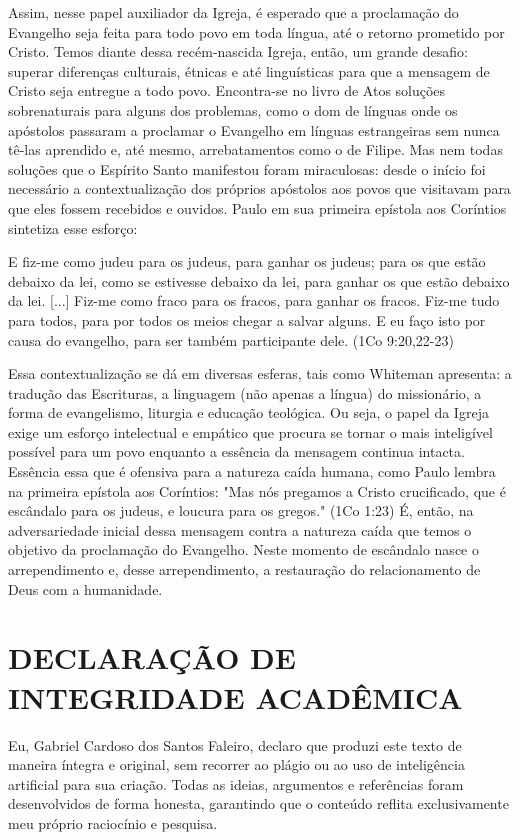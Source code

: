\documentclass[
    article,            %
	12pt,				%
	oneside,			%
	a4paper,			%
	chapter=TITLE,		%
	section=TITLE,		%
	english,			%
	french,				%
	spanish,			%
	brazil				%
	]{abntex2}
\begin{document}
Assim, nesse papel auxiliador da Igreja, é esperado que a proclamação do Evangelho seja feita para todo povo em toda língua, até o retorno prometido por Cristo. Temos diante dessa recém-nascida Igreja, então, um grande desafio: superar diferenças culturais, étnicas e até linguísticas para que a mensagem de Cristo seja entregue a todo povo. Encontra-se no livro de Atos soluções sobrenaturais para alguns dos problemas, como o dom de línguas onde os apóstolos passaram a proclamar o Evangelho em línguas estrangeiras sem nunca tê-las aprendido e, até mesmo, arrebatamentos como o de Filipe. Mas nem todas soluções que o Espírito Santo manifestou foram miraculosas: desde o início foi necessário a contextualização dos próprios apóstolos aos povos que visitavam para que eles fossem recebidos e ouvidos. Paulo em sua primeira epístola aos Coríntios sintetiza esse esforço:
\begin{citacao}
E fiz-me como judeu para os judeus, para ganhar os judeus; para os que estão debaixo da lei, como se estivesse debaixo da lei, para ganhar os que estão debaixo da lei. [...] Fiz-me como fraco para os fracos, para ganhar os fracos. Fiz-me tudo para todos, para por todos os meios chegar a salvar alguns. E eu faço isto por causa do evangelho, para ser também participante dele. (1Co 9:20,22-23)
\end{citacao}

Essa contextualização se dá em diversas esferas, tais como Whiteman apresenta: a tradução das Escrituras, a linguagem (não apenas a língua) do missionário, a forma de evangelismo, liturgia e educação teológica. Ou seja, o papel da Igreja exige um esforço intelectual e empático que procura se tornar o mais inteligível possível para um povo enquanto a essência da mensagem continua intacta. Essência essa que é ofensiva para a natureza caída humana, como Paulo lembra na primeira epístola aos Coríntios: "Mas nós pregamos a Cristo crucificado, que é escândalo para os judeus, e loucura para os gregos." (1Co 1:23) É, então, na adversariedade inicial dessa mensagem contra a natureza caída que temos o objetivo da proclamação do Evangelho. Neste momento de escândalo nasce o arrependimento e, desse arrependimento, a restauração do relacionamento de Deus com a humanidade.

\pagebreak
\section{DECLARAÇÃO DE INTEGRIDADE ACADÊMICA}
Eu, Gabriel Cardoso dos Santos Faleiro, declaro que produzi este texto de maneira íntegra e original, sem recorrer ao plágio ou ao uso de inteligência artificial para sua criação. Todas as ideias, argumentos e referências foram desenvolvidos de forma honesta, garantindo que o conteúdo reflita exclusivamente meu próprio raciocínio e pesquisa.
\pagebreak

\nocite{BIBLIA}
\nocite{EDILSON}
\renewcommand{\bibname}{{REFER\^ENCIAS}}

\end{document}
